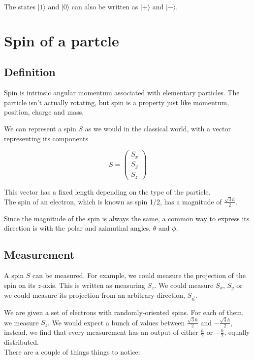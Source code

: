 \documentclass{article}
\begin{document}
The states \(|1\rangle\) and \(|0\rangle\) can also be written as \(|+\rangle\) and \(|-\rangle\).

\pagebreak

\section{Spin of a partcle}

\subsection{Definition}

Spin is intrinsic angular momentum associated with elementary particles.
The particle isn't actually rotating, but spin is a property just like momentum, position, charge and mass.

We can represent a spin \(S\) as we would in the classical world, with a vector representing its components

\[
    S=
    \begin{pmatrix}
        S_x \\
        S_y \\
        S_z
    \end{pmatrix}
\]

This vector has a fixed length depending on the type of the particle. \\
The spin of an electron, which is known as spin 1/2, has a magnitude of \(\frac{\sqrt{3}\hbar}{2}\).

Since the magnitude of the spin is always the same, a common way to express its direction is with the polar and azimuthal angles, \(\theta\) and \(\phi\).

\subsection{Measurement}

A spin \(S\) can be measured. For example, we could measure the projection of the spin on its \(z\)-axis.
This is written as measuring \(S_z\). We could measure \(S_x\), \(S_y\) or we could measure its projection from an arbitrary direction, \(S_{\vec{n}}\).

We are given a set of electrons with randomly-oriented spins. For each of them, we measure \(S_z\).
We would expect a bunch of values between \(\frac{\sqrt{3}\hbar}{2}\) and \(-\frac{\sqrt{3}\hbar}{2}\),
instead, we find that every measurement has an output of either \(\frac{\hbar}{2}\) or \(-\frac{\hbar}{2}\), equally distributed. \\
There are a couple of things things to notice:
\end{document}
